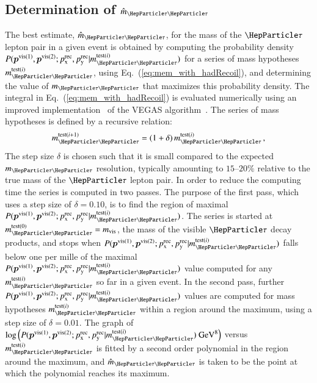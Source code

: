 \subsection{Determination of $\hat{m}_{\Pgt\Pgt}$}
\label{sec:mem_numericalMaximization}

The best estimate, $\hat{m}_{\Pgt\Pgt}$, for the mass of the $\Pgt$ lepton pair in a given event
is obtained by computing the probability density $P(\bm{p}^{\vis(1)},\bm{p}^{\vis(2)};\pX^{\rec},\pY^{\rec}|m_{\Pgt\Pgt}^{\textrm{test}(i)})$ 
for a series of mass hypotheses $m_{\Pgt\Pgt}^{\textrm{test}(i)}$, using Eq.~(\ref{eq:mem_with_hadRecoil}), and determining the value of $m_{\Pgt\Pgt}$ that maximizes this probability density.
The integral in Eq.~(\ref{eq:mem_with_hadRecoil}) is evaluated numerically
using an improved implementation~\cite{VAMP} of the VEGAS algorithm~\cite{VEGAS}.
The series of mass hypotheses is defined by a recursive relation: 
\begin{equation}
m_{\Pgt\Pgt}^{\textrm{test}(i + 1)} = (1 + \delta) \,  m_{\Pgt\Pgt}^{\textrm{test}(i)} \, ,
\label{eq:mTauTau_step_size}
\end{equation}
The step size $\delta$ is chosen such that it is small compared to the expected $m_{\Pgt\Pgt}$ resolution,
typically amounting to $15$--$20\%$ relative to the true mass of the $\Pgt$ lepton pair.
In order to reduce the computing time the series is computed in two passes.
The purpose of the first pass, which uses a step size of $\delta = 0.10$, is to find the region of maximal $P(\bm{p}^{\vis(1)},\bm{p}^{\vis(2)};\pX^{\rec},\pY^{\rec}|m_{\Pgt\Pgt}^{\textrm{test}(i)})$.
The series is started at $m_{\Pgt\Pgt}^{\textrm{test}(0)} = m_{\vis}$,
the mass of the visible $\Pgt$ decay products, 
and stops when $P(\bm{p}^{\vis(1)},\bm{p}^{\vis(2)};\pX^{\rec},\pY^{\rec}|m_{\Pgt\Pgt}^{\textrm{test}(i)})$ falls below one per mille of the maximal $P(\bm{p}^{\vis(1)},\bm{p}^{\vis(2)};\pX^{\rec},\pY^{\rec}|m_{\Pgt\Pgt}^{\textrm{test}(i)})$ value
computed for any $m_{\Pgt\Pgt}^{\textrm{test}(i)}$ so far in a given event.
In the second pass, further $P(\bm{p}^{\vis(1)},\bm{p}^{\vis(2)};\pX^{\rec},\pY^{\rec}|m_{\Pgt\Pgt}^{\textrm{test}(i)})$ values are computed for mass hypotheses $m_{\Pgt\Pgt}^{\textrm{test}(i)}$ within a region around the maximum,
using a step size of $\delta = 0.01$.
The graph of $\log \left( P(\bm{p}^{\vis(1)},\bm{p}^{\vis(2)};\pX^{\rec},\pY^{\rec}|m_{\Pgt\Pgt}^{\textrm{test}(i)}) \mbox{~GeV}^{8} \right)$ versus $m_{\Pgt\Pgt}^{\textrm{test}(i)}$ is fitted by a second order polynomial
in the region around the maximum,
and $\hat{m}_{\Pgt\Pgt}$ is taken to be the point at which the polynomial reaches its maximum.
